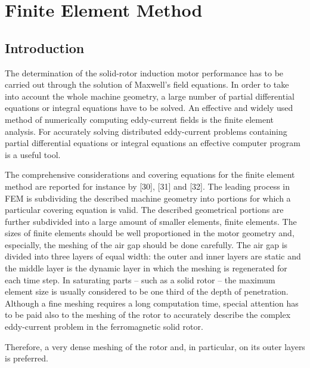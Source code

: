 
\chapter{Finite Element Method}
\label{chap:Finite-Element-Method}

\section{Introduction} %

The determination of the solid-rotor induction motor performance has to be carried out through
the solution of Maxwell’s field equations. In order to take into account the whole machine
geometry, a large number of partial differential equations or integral equations have to be
solved. An effective and widely used method of numerically computing eddy-current fields is the
finite element analysis. For accurately solving distributed eddy-current problems containing
partial differential equations or integral equations an effective computer program is a useful
tool.

The comprehensive considerations and covering equations for the finite element method are
reported for instance by [30], [31] and [32]. The leading process in FEM is subdividing the
described machine geometry into portions for which a particular covering equation is valid. The
described geometrical portions are further subdivided into a large amount of smaller elements,
finite elements. The sizes of finite elements should be well proportioned in the motor geometry
and, especially, the meshing of the air gap should be done carefully. The air gap is divided
into three layers of equal width: the outer and inner layers are static and the middle layer is
the dynamic layer in which the meshing is regenerated for each time step. In saturating parts –
such as a solid rotor – the maximum element size is usually considered to be one third of the
depth of penetration. Although a fine meshing requires a long computation time, special
attention has to be paid also to the meshing of the rotor to accurately describe the complex
eddy-current problem in the ferromagnetic solid rotor.

Therefore, a very dense meshing of the rotor and, in particular, on its outer layers is
preferred.

